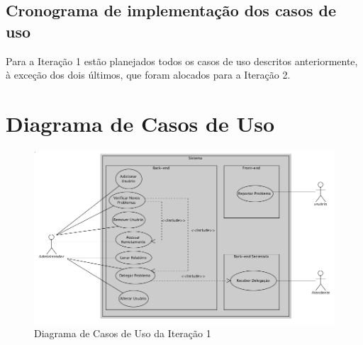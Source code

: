 \documentclass[brazil,times]{abnt}
\begin{document}
\subsection{Cronograma de implementação dos casos de uso}
Para a Iteração 1 estão planejados todos os casos de uso descritos
anteriormente, à exceção dos dois últimos, que foram alocados para a Iteração 2.

\section{Diagrama de Casos de Uso}
\begin{figure}[htp]
\begin{center}
  \includegraphics[width=\linewidth]{diagramas/diagramaDeUso.png}
  \caption[Diagrama de Casos de Uso da Iteração 1]{Diagrama de Casos de Uso da Iteração 1}
  \label{diagrama-casos-uso}
\end{center}
\end{figure}

\newpage
\end{document}
